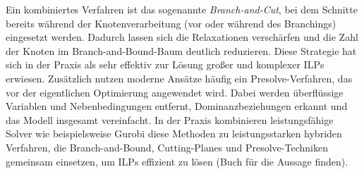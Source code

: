 \documentclass[bachelor, german]{algothesis}
\begin{document}
Ein kombiniertes Verfahren ist das sogenannte \emph{Branch-and-Cut}, bei dem Schnitte bereits während der Knotenverarbeitung (vor oder während des Branchings) eingesetzt werden. Dadurch lassen sich die Relaxationen verschärfen und die Zahl der Knoten im Branch-and-Bound-Baum deutlich reduzieren. Diese Strategie hat sich in der Praxis als sehr effektiv zur Lösung großer und komplexer ILPs erwiesen.\newline
Zusätzlich nutzen moderne Ansätze häufig ein Presolve-Verfahren, das vor der eigentlichen Optimierung angewendet wird. Dabei werden überflüssige Variablen und Nebenbedingungen entfernt, Dominanzbeziehungen erkannt und das Modell insgesamt vereinfacht.\newline
In der Praxis kombinieren leistungsfähige Solver wie beispielsweise Gurobi\cite{Gurobi2025} diese Methoden zu leistungsstarken hybriden Verfahren, die Branch-and-Bound, Cutting-Planes und Presolve-Techniken gemeinsam einsetzen, um ILPs effizient zu lösen (Buch für die Aussage finden).
\end{document}
